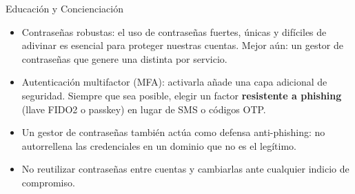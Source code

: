 \documentclass[aspectratio=169,11pt]{beamer}
\begin{document}
\begin{frame}{Educación y Concienciación}
\small
  \begin{itemize}
  \item Contraseñas robustas: el uso de contraseñas fuertes, únicas y difíciles de adivinar es esencial para proteger nuestras cuentas. Mejor aún: un gestor de contraseñas que genere una distinta por servicio.
  \item Autenticación multifactor (MFA): activarla añade una capa adicional de seguridad. Siempre que sea posible, elegir un factor \textbf{resistente a phishing} (llave FIDO2 o passkey) en lugar de SMS o códigos OTP.
  \item Un gestor de contraseñas también actúa como defensa anti-phishing: no autorrellena las credenciales en un dominio que no es el legítimo.
  \item No reutilizar contraseñas entre cuentas y cambiarlas ante cualquier indicio de compromiso.
  \end{itemize}
\end{frame}
\end{document}
